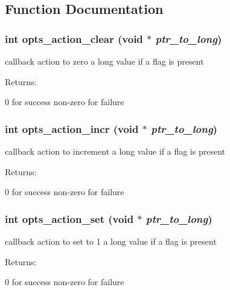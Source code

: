 \subsection{Function Documentation}
\subsubsection{\setlength{\rightskip}{0pt plus 5cm}int opts\_\-action\_\-clear (void $\ast$ {\em ptr\_\-to\_\-long})}\label{group__opts__actions_a0}


callback action to zero a long value if a flag is present

\begin{Desc}
\item[Returns: ]\par
0 for success non-zero for failure \end{Desc}
\subsubsection{\setlength{\rightskip}{0pt plus 5cm}int opts\_\-action\_\-incr (void $\ast$ {\em ptr\_\-to\_\-long})}\label{group__opts__actions_a1}


callback action to increment a long value if a flag is present

\begin{Desc}
\item[Returns: ]\par
0 for success non-zero for failure \end{Desc}
\subsubsection{\setlength{\rightskip}{0pt plus 5cm}int opts\_\-action\_\-set (void $\ast$ {\em ptr\_\-to\_\-long})}\label{group__opts__actions_a2}


callback action to set to 1 a long value if a flag is present

\begin{Desc}
\item[Returns: ]\par
0 for success non-zero for failure \end{Desc}
